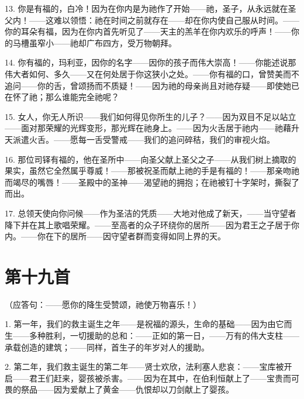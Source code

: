 13. 你是有福的，白冷！因为在你内是为祂作了开始——祂，圣子，从永远就在圣父内！——这难以领悟：祂在时间之前就存在——却在你内使自己服从时间。——你的耳朵有福，因为在你内首先听见了——天主的羔羊在你内欢乐的呼声！——你的马槽虽窄小——祂却广布四方，受万物朝拜。\par

14. 你有福的，玛利亚，因你的名字——因你的孩子而伟大崇高！——你能述说那伟大者如何、多久——又在何处居于你这狭小之处。——你有福的口，曾赞美而不追问——你的舌，曾颂扬而不质疑！——因为祂的母亲尚且对祂存疑——即使她已在怀了祂；那么谁能完全祂呢？\par

15. 女人，你无人所识——我们如何得见你所生的儿子？——因为双目不足以站立——面对那荣耀的光辉变形，那光辉在祂身上。——因为火舌居于祂内——祂藉升天派遣火舌。——愿每一舌受警戒——我们的追问碎秸，我们的审视火焰。\par

16. 那位司铎有福的，他在圣所中——向圣父献上圣父之子——从我们树上摘取的果实，虽然它全然属乎尊威！——那被祝圣而献上祂的手是有福的！——那亲吻祂而竭尽的嘴唇！——圣殿中的圣神——渴望祂的拥抱；在祂被钉十字架时，撕裂了而出。\par

17. 总领天使向你问候——作为圣洁的凭质——大地对他成了新天，——当守望者降下并在其上歌唱荣耀。——至高者的众子环绕你的居所——因为君王之子居于你内。——你在下的居所——因守望者群而变得如同上界的天。\par


\section{第十九首}

（应答句：——愿你的降生受赞颂，祂使万物喜乐！）\par

1. 第一年，我们的救主诞生之年——是祝福的源头，生命的基础——因为由它而生——多种胜利，一切援助的总和：——正如的第一日，——万有的伟大支柱——承载创造的建筑；——同样，首生子的年岁对人的援助。\par

2. 第二年，我们救主诞生的第二年——贤士欢欣，法利塞人悲哀：——宝库被开启——君王们赶来，婴孩被杀害。——因为在其中，在伯利恒献上了——宝贵而可畏的祭品——因为爱献上了黄金——仇恨却以刀剑献上了婴孩。\par

